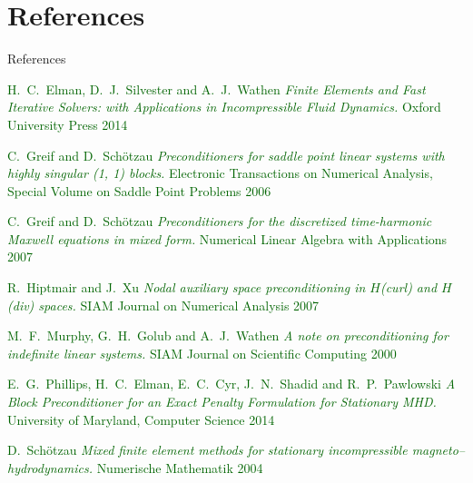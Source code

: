 \documentclass[12pt]{beamer}
\newcommand{\gr}[1]{\textcolor{darkgreen} {#1}}
\begin{document}
\section{References}
\begin{frame}{References}

\begin{thebibliography}{9}
\tiny
{}
\gr{H.~C.~Elman, D.~J.~Silvester and A.~J.~Wathen}
\newblock \gr{\it Finite Elements and Fast Iterative Solvers: with Applications in Incompressible Fluid Dynamics.}
\newblock \gr{Oxford University Press 2014}

\gr{C.~Greif and D.~Sch{\"o}tzau}
\newblock \gr{\it Preconditioners for saddle point linear systems with highly singular (1, 1) blocks.}
\newblock \gr{Electronic Transactions on Numerical Analysis, Special Volume on Saddle Point Problems 2006}

\gr{C.~Greif and D.~Sch{\"o}tzau}
\newblock \gr{\it Preconditioners for the discretized time-harmonic {M}axwell equations in mixed form.}
\newblock \gr{Numerical Linear Algebra with Applications 2007}

\gr{R.~Hiptmair and J.~Xu}
\newblock \gr{\it Nodal auxiliary space preconditioning in {$H$(curl) and $H$(div)} spaces.}
\newblock \gr{SIAM Journal on Numerical Analysis 2007}

\gr{M.~F.~Murphy, G.~H.~Golub and A.~J.~Wathen}
\newblock \gr{\it A note on preconditioning for indefinite linear systems.}
\newblock \gr{SIAM Journal on Scientific Computing 2000}


\gr{E.~G.~Phillips, H.~C.~Elman, E.~C.~Cyr, J.~N.~Shadid and R.~P.~Pawlowski}
\newblock \gr{\it A Block Preconditioner for an Exact Penalty Formulation for Stationary {MHD}.}
\newblock \gr{University of Maryland, Computer Science 2014}


\gr{D.~Sch{\"o}tzau}
\newblock \gr{\it Mixed finite element methods for stationary incompressible magneto--hydrodynamics.}
\newblock \gr{Numerische Mathematik 2004}









\end{thebibliography}
\end{frame}
\end{document}

